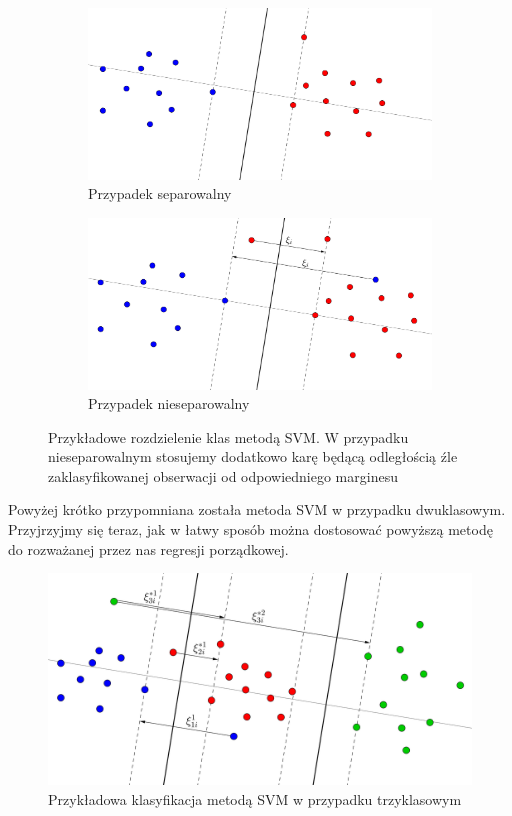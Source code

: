 \documentclass{mini}
\begin{document}
\begin{figure}[!hb]
  \begin{subfigure}[]{\textwidth}
    \includegraphics[width=\textwidth]{graphics/svm1.png}
    \caption{Przypadek separowalny}
  \end{subfigure}
  \begin{subfigure}[]{\textwidth}
    \includegraphics[width=\textwidth]{graphics/svm1eps.png}
    \caption{Przypadek nieseparowalny}
  \end{subfigure}
  \caption{Przykładowe rozdzielenie klas metodą SVM. W przypadku nieseparowalnym stosujemy dodatkowo karę będącą odległością źle zaklasyfikowanej obserwacji od odpowiedniego marginesu}
  \label{svm1}
\end{figure}

Powyżej krótko przypomniana została metoda SVM w przypadku dwuklasowym. Przyjrzyjmy się teraz, jak w łatwy sposób można dostosować powyższą metodę do rozważanej przez nas regresji porządkowej.

\begin{figure}[!h]
\begin{center}
\includegraphics[width=\textwidth]{graphics/svm3.png}
\end{center}
\caption{Przykładowa klasyfikacja metodą SVM w przypadku trzyklasowym}
\label{svm}
\end{figure}
\end{document}
